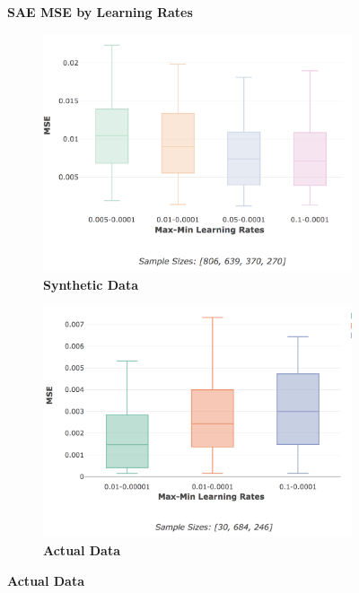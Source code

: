 \documentclass[a4paper,11pt,oneside]{article}
\theoremstyle{plain}
\theoremstyle{definition}
\begin{document}
	
	\begin{figure}[H]
		\centering
		\textbf{SAE MSE by Learning Rates}
		\begin{subfigure}{.5\textwidth}
			\centering 
			\includegraphics[scale=0.3]{images/results/network/lr/synth_mse_minmax_lr.png}
			\caption{\textbf{Synthetic Data} 
				\newline }
			\label{figure-synth_mse_minmax_lr}
		\end{subfigure}%
		\begin{subfigure}{.5\textwidth}
			\centering 
			\includegraphics[scale=0.3]{images/results/network/lr/actual_mse_minmax_lr.png}
			\caption{\textbf{Actual Data} 
				\newline }

\end{subfigure}
\end{figure}
\end{document}
